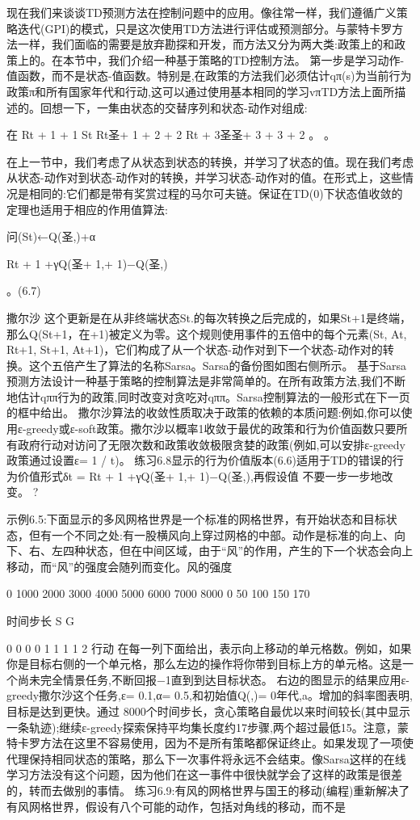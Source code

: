 现在我们来谈谈TD预测方法在控制问题中的应用。像往常一样，我们遵循广义策略迭代(GPI)的模式，只是这次使用TD方法进行评估或预测部分。与蒙特卡罗方法一样，我们面临的需要是放弃勘探和开发，而方法又分为两大类:政策上的和政策上的。在本节中，我们介绍一种基于策略的TD控制方法。
第一步是学习动作-值函数，而不是状态-值函数。特别是,在政策的方法我们必须估计qπ(s)为当前行为政策π和所有国家年代和行动,这可以通过使用基本相同的学习vπTD方法上面所描述的。回想一下，一集由状态的交替序列和状态-动作对组成:


在
Rt + 1 + 1 St
Rt圣+ 1 + 2 + 2
Rt + 3圣圣+ 3 + 3 + 2
。 					。




在上一节中，我们考虑了从状态到状态的转换，并学习了状态的值。现在我们考虑从状态-动作对到状态-动作对的转换，并学习状态-动作对的值。在形式上，这些情况是相同的:它们都是带有奖赏过程的马尔可夫链。保证在TD(0)下状态值收敛的定理也适用于相应的作用值算法:

问(St)←Q(圣,)+α

Rt + 1 +γQ(圣+ 1,+ 1)−Q(圣,)

。(6.7)




撒尔沙
这个更新是在从非终端状态St.的每次转换之后完成的，如果St+1是终端，那么Q(St+1，在+1)被定义为零。这个规则使用事件的五倍中的每个元素(St, At, Rt+1, St+1, At+1)，它们构成了从一个状态-动作对到下一个状态-动作对的转换。这个五倍产生了算法的名称Sarsa。Sarsa的备份图如图右侧所示。
基于Sarsa预测方法设计一种基于策略的控制算法是非常简单的。在所有政策方法,我们不断地估计qππ行为的政策,同时改变对贪吃对qππ。Sarsa控制算法的一般形式在下一页的框中给出。
撒尔沙算法的收敛性质取决于政策的依赖的本质问题:例如,你可以使用ε-greedy或ε-soft政策。撒尔沙以概率1收敛于最优的政策和行为价值函数只要所有政府行动对访问了无限次数和政策收敛极限贪婪的政策(例如,可以安排ε-greedy政策通过设置ε= 1 / t)。
练习6.8显示的行为价值版本(6.6)适用于TD的错误的行为价值形式δt = Rt + 1 +γQ(圣+ 1,+ 1)−Q(圣,),再假设值
不要一步一步地改变。 					?

示例6.5:下面显示的多风网格世界是一个标准的网格世界，有开始状态和目标状态，但有一个不同之处:有一股横风向上穿过网格的中部。动作是标准的向上、向下、右、左四种状态，但在中间区域，由于“风”的作用，产生的下一个状态会向上移动，而“风”的强度会随列而变化。风的强度

0 1000 2000 3000 4000 5000 6000 7000 8000 0
50 100 150 170

时间步长
S G

0 0 0 					0 1 1 1 1 2
行动
在每一列下面给出，表示向上移动的单元格数。例如，如果你是目标右侧的一个单元格，那么左边的操作将你带到目标上方的单元格。这是一个尚未完全情景任务,不断回报−1直到到达目标状态。
右边的图显示的结果应用ε-greedy撒尔沙这个任务,ε= 0.1,α= 0.5,和初始值Q(,)= 0年代,a。增加的斜率图表明,目标是达到更快。通过
8000个时间步长，贪心策略自最优以来时间较长(其中显示一条轨迹);继续ε-greedy探索保持平均集长度约17步骤,两个超过最低15。注意，蒙特卡罗方法在这里不容易使用，因为不是所有策略都保证终止。如果发现了一项使代理保持相同状态的策略，那么下一次事件将永远不会结束。像Sarsa这样的在线学习方法没有这个问题，因为他们在这一事件中很快就学会了这样的政策是很差的，转而去做别的事情。
练习6.9:有风的网格世界与国王的移动(编程)重新解决了有风网格世界，假设有八个可能的动作，包括对角线的移动，而不是


